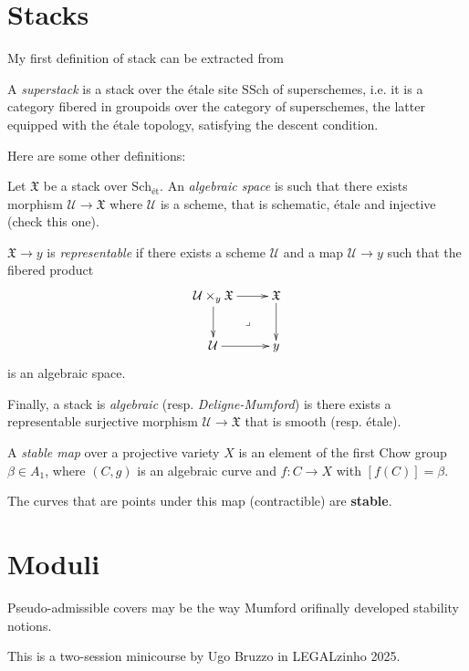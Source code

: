 \section{Stacks}
\label{section-stacks}

My first definition of stack can be extracted
from

\begin{definition}
\label{definition-superstack}
A {\it superstack} is a stack over
the étale site $\text{SSch}$ of superschemes,
i.e. it is a category fibered in groupoids
over the category of superschemes,
the latter equipped with the 
étale topology, 
satisfying the descent condition.
\end{definition}

Here are some other definitions:

\begin{definition}
\label{definition-algebraic-stacks}
Let  $\mathfrak{X}$ be a stack over $\text{Sch}_{\text{ét}}$.
An {\it algebraic space} is
such that there exists morphism
$\mathcal{U} \to \mathfrak{X}$
where $\mathcal{U}$ is a scheme, that is
schematic, étale and injective (check this one).

$\mathfrak{X} \to y$ is {\it representable} if
there exists a scheme $\mathcal{U}$ and a map
$\mathcal{U} \to y$ such that the 
fibered product
$$
\xymatrix{
\mathcal{U} \times_y \mathfrak{X}\ar[r]\ar[d]\ar@{}[dr]|-{\lrcorner}&\mathfrak{X}\ar[d]\\
\mathcal{U}\ar[r]&y
}
$$
is an algebraic space.

Finally, a  stack is {\it algebraic} (resp. {\it Deligne-Mumford})
is there exists a 
representable surjective morphism  $\mathcal{U} \to \mathfrak{X}$ 
that is smooth (resp. étale).

A {\it stable map} over a projective
variety $X$ is an element of the first
Chow group $\beta \in A_1$, where
 $(C,g)$ is an algebraic curve and
$f:C \to X$ with $[f(C)]=\beta$.
\end{definition}

\noindent
The curves that are points under this map
(contractible) are {\bf stable}.

\section{Moduli}
\label{section-moduli}

\noindent
Pseudo-admissible covers may be the way Mumford orifinally developed stability
notions.

\noindent
This is a two-session minicourse by Ugo Bruzzo
in LEGALzinho 2025.

